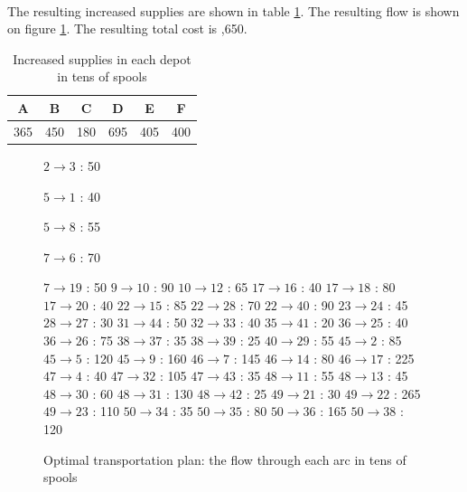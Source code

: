 \paragraph{}
The resulting increased supplies are shown in table \ref{increased-supplies}. The resulting flow is shown on figure \ref{flow3-2c}. The resulting total cost is ,650.

\begin{table}[H]
\centering
\begin{tabular}{|c|c|c|c|c|c|}
\hline
A & B & C & D & E & F \\ \hline
365 & 450 & 180 & 695 & 405 & 400  \\ \hline
\end{tabular}
\caption{Increased supplies in each depot in tens of spools}
\label{increased-supplies}
\end{table}

\begin{figure}[H]
\centering
\begin{multicols}{5}
$ 2 \rightarrow 3 $ : 50

$ 5 \rightarrow 1 $ : 40

$ 5 \rightarrow 8 $ : 55

$ 7 \rightarrow 6 $ : 70

$ 7 \rightarrow 19 $ : 50
$ 9 \rightarrow 10 $ : 90
$ 10 \rightarrow 12 $ : 65
$ 17 \rightarrow 16 $ : 40
$ 17 \rightarrow 18 $ : 80
$ 17 \rightarrow 20 $ : 40
$ 22 \rightarrow 15 $ : 85
$ 22 \rightarrow 28 $ : 70
$ 22 \rightarrow 40 $ : 90
$ 23 \rightarrow 24 $ : 45
$ 28 \rightarrow 27 $ : 30
$ 31 \rightarrow 44 $ : 50
$ 32 \rightarrow 33 $ : 40
$ 35 \rightarrow 41 $ : 20
$ 36 \rightarrow 25 $ : 40
$ 36 \rightarrow 26 $ : 75
$ 38 \rightarrow 37 $ : 35
$ 38 \rightarrow 39 $ : 25
$ 40 \rightarrow 29 $ : 55
$ 45 \rightarrow 2 $ : 85
$ 45 \rightarrow 5 $ : 120
$ 45 \rightarrow 9 $ : 160
$ 46 \rightarrow 7 $ : 145
$ 46 \rightarrow 14 $ : 80
$ 46 \rightarrow 17 $ : 225
$ 47 \rightarrow 4 $ : 40
$ 47 \rightarrow 32 $ : 105
$ 47 \rightarrow 43 $ : 35
$ 48 \rightarrow 11 $ : 55
$ 48 \rightarrow 13 $ : 45
$ 48 \rightarrow 30 $ : 60
$ 48 \rightarrow 31 $ : 130
$ 48 \rightarrow 42 $ : 25
$ 49 \rightarrow 21 $ : 30
$ 49 \rightarrow 22 $ : 265
$ 49 \rightarrow 23 $ : 110
$ 50 \rightarrow 34 $ : 35
$ 50 \rightarrow 35 $ : 80
$ 50 \rightarrow 36 $ : 165
$ 50 \rightarrow 38 $ : 120
\end{multicols}
\caption{Optimal transportation plan: the flow through each arc in tens of spools}
\label{flow3-2c}
\end{figure}

